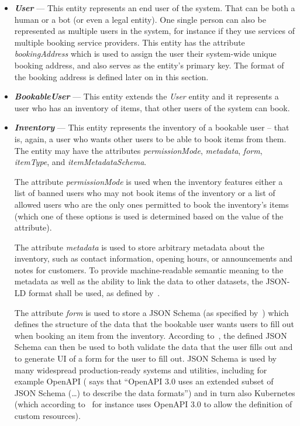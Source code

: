 \begin{itemize}
    \item \textit{\textbf{User}} --- This entity represents an end user of the system. That can be both a human or a bot (or even a legal entity). One single person can also be represented as multiple users in the system, for instance if they use services of multiple booking service providers. This entity has the attribute \textit{bookingAddress} which is used to assign the user their system-wide unique booking address, and also serves as the entity's primary key. The format of the booking address is defined later on in this section.
    \item \textit{\textbf{BookableUser}} --- This entity extends the \textit{User} entity and it represents a user who has an inventory of items, that other users of the system can book.
    \item \textit{\textbf{Inventory}} --- This entity represents the inventory of a bookable user -- that is, again, a user who wants other users to be able to book items from them. The entity may have the attributes \textit{permissionMode}, \textit{metadata}, \textit{form}, \textit{itemType}, and \textit{itemMetadataSchema}.

    The attribute \textit{permissionMode} is used when the inventory features either a list of banned users who may not book items of the inventory or a list of allowed users who are the only ones permitted to book the inventory's items (which one of these options is used is determined based on the value of the attribute).

    The attribute \textit{metadata} is used to store arbitrary metadata about the inventory, such as contact information, opening hours, or announcements and notes for customers. To provide machine-readable semantic meaning to the metadata as well as the ability to link the data to other datasets, the JSON-LD format shall be used, as defined by~\cite{w3c_json_ld_1_0, w3c_json_ld_1_1}.

    The attribute \textit{form} is used to store a JSON Schema (as specified by~\cite{json_schema_spec}) which defines the structure of the data that the bookable user wants users to fill out when booking an item from the inventory. According to~\cite{json_schema}, the defined JSON Schema can then be used to both validate the data that the user fills out and to generate UI of a form for the user to fill out. JSON Schema is used by many widespread production-ready systems and utilities, including for example OpenAPI (\cite{openapi} says that \enquote{OpenAPI 3.0 uses an extended subset of JSON Schema (\ldots{}) to describe the data formats}) and in turn also Kubernetes (which according to~\cite{kubernetes} for instance uses OpenAPI 3.0 to allow the definition of custom resources).


\end{itemize}
